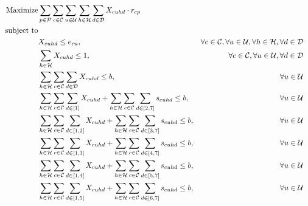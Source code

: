 \documentclass[11pt]{article}
\begin{document}
\begin{align}
\text{Maximize} & \displaystyle
\sum\limits_{p\in \mathcal{P}}
\sum\limits_{c\in \mathcal{C}}
\sum\limits_{u\in \mathcal{U}}
\sum\limits_{h\in \mathcal{H}}
\sum\limits_{d\in \mathcal{D}}
X_{{c}{u}{h}{d}} \cdot r_{{c}{p}} \label{mathmodel_obj}&\\
\text{subject to} \notag\\
&X_{{c}{u}{h}{d}} \leq e_{{c}{u}},&\forall c \in \mathcal{C}, \forall u \in \mathcal{U}, \forall h \in \mathcal{H}, \forall d \in \mathcal{D} \label{mathmodel_eligibility}&\\
&\sum\limits_{h\in\mathcal{H}}X_{{c}{u}{h}{d}} \leq 1, &\forall c \in \mathcal{C}, \forall u \in \mathcal{U}, \forall d \in \mathcal{D} \label{mathmodel_singlechannel}&\\
&\sum\limits_{h\in\mathcal{H}}\sum\limits_{c\in\mathcal{C}}\sum\limits_{d\in\mathcal{D}}X_{{c}{u}{h}{d}} \leq b, &\forall u \in \mathcal{U} \label{mathmodel_percustomercommlimit}&\\
&\sum\limits_{h\in\mathcal{H}}\sum\limits_{c\in\mathcal{C}}\sum\limits_{d\in [1]}X_{{c}{u}{h}{d}} + \sum\limits_{h\in\mathcal{H}}\sum\limits_{c\in\mathcal{C}}\sum\limits_{d\in [2,7]}s_{{c}{u}{h}{d}} \leq b, &\forall u \in \mathcal{U} \label{mathmodel_percustomercommlimit_rh1}&\\
&\sum\limits_{h\in\mathcal{H}}\sum\limits_{c\in\mathcal{C}}\sum\limits_{d\in [1,2]}X_{{c}{u}{h}{d}} + \sum\limits_{h\in\mathcal{H}}\sum\limits_{c\in\mathcal{C}}\sum\limits_{d\in [3,7]}s_{{c}{u}{h}{d}} \leq b, &\forall u \in \mathcal{U} \label{mathmodel_percustomercommlimit_rh2}&\\
&\sum\limits_{h\in\mathcal{H}}\sum\limits_{c\in\mathcal{C}}\sum\limits_{d\in [1,3]}X_{{c}{u}{h}{d}} + \sum\limits_{h\in\mathcal{H}}\sum\limits_{c\in\mathcal{C}}\sum\limits_{d\in [4,7]}s_{{c}{u}{h}{d}} \leq b, &\forall u \in \mathcal{U} \label{mathmodel_percustomercommlimit_rh3}&\\
&\sum\limits_{h\in\mathcal{H}}\sum\limits_{c\in\mathcal{C}}\sum\limits_{d\in [1,4]}X_{{c}{u}{h}{d}} + \sum\limits_{h\in\mathcal{H}}\sum\limits_{c\in\mathcal{C}}\sum\limits_{d\in [5,7]}s_{{c}{u}{h}{d}} \leq b, &\forall u \in \mathcal{U} \label{mathmodel_percustomercommlimit_rh4}&\\
&\sum\limits_{h\in\mathcal{H}}\sum\limits_{c\in\mathcal{C}}\sum\limits_{d\in [1,5]}X_{{c}{u}{h}{d}} + \sum\limits_{h\in\mathcal{H}}\sum\limits_{c\in\mathcal{C}}\sum\limits_{d\in [6,7]}s_{{c}{u}{h}{d}} \leq b, &\forall u \in \mathcal{U} \label{mathmodel_percustomercommlimit_rh5}&\\

\end{align}
\end{document}

